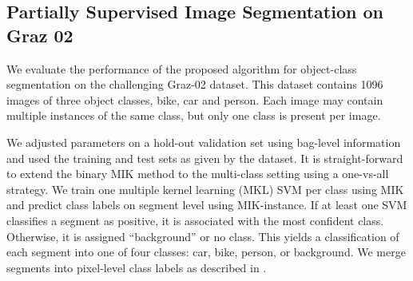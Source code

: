 \subsection{Partially Supervised Image Segmentation on Graz 02}

We evaluate the performance of the proposed algorithm for object-class
segmentation on the challenging Graz-02 dataset.  This dataset contains 1096
images of three object classes, bike, car and person.  Each image may contain
multiple instances of the same class, but only one class is present per image.

We adjusted parameters on a hold-out validation set using bag-level information
and used the training and test sets as given by the dataset.  It is
straight-forward to extend the binary MIK method to the multi-class setting
using a one-vs-all strategy.
We train one multiple kernel learning (MKL) SVM per class using MIK and predict
class labels on segment level using MIK-instance. If at least one SVM
classifies a segment as positive, it is associated with the most confident
class. Otherwise, it is assigned ``background'' or no class.
This yields a classification of each segment into one of four classes: car,
bike, person, or background. We merge segments into pixel-level class labels as
described in .


